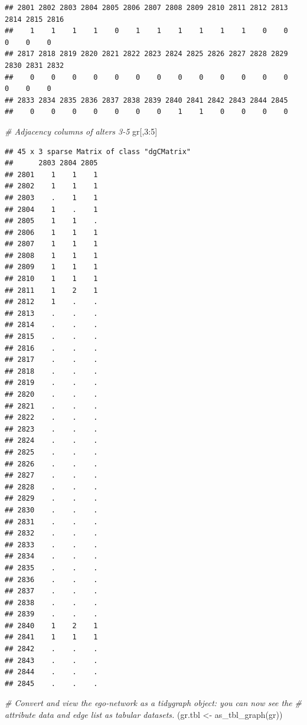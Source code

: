 \documentclass[
]{book}
\newenvironment{Shaded}{\begin{snugshade}}{\end{snugshade}}
\newcommand{\CommentTok}[1]{\textcolor[rgb]{0.56,0.35,0.01}{\textit{#1}}}
\newcommand{\DecValTok}[1]{\textcolor[rgb]{0.00,0.00,0.81}{#1}}
\newcommand{\FunctionTok}[1]{\textcolor[rgb]{0.00,0.00,0.00}{#1}}
\newcommand{\NormalTok}[1]{#1}
\newcommand{\OtherTok}[1]{\textcolor[rgb]{0.56,0.35,0.01}{#1}}
\newcommand{\SpecialCharTok}[1]{\textcolor[rgb]{0.00,0.00,0.00}{#1}}
\begin{document}
\begin{verbatim}
## 2801 2802 2803 2804 2805 2806 2807 2808 2809 2810 2811 2812 2813 2814 2815 2816 
##    1    1    1    1    0    1    1    1    1    1    1    0    0    0    0    0 
## 2817 2818 2819 2820 2821 2822 2823 2824 2825 2826 2827 2828 2829 2830 2831 2832 
##    0    0    0    0    0    0    0    0    0    0    0    0    0    0    0    0 
## 2833 2834 2835 2836 2837 2838 2839 2840 2841 2842 2843 2844 2845 
##    0    0    0    0    0    0    0    1    1    0    0    0    0
\end{verbatim}

\begin{Shaded}
\begin{Highlighting}[]
\CommentTok{\# Adjacency columns of alters 3{-}5}
\NormalTok{gr[,}\DecValTok{3}\SpecialCharTok{:}\DecValTok{5}\NormalTok{]}
\end{Highlighting}
\end{Shaded}

\begin{verbatim}
## 45 x 3 sparse Matrix of class "dgCMatrix"
##      2803 2804 2805
## 2801    1    1    1
## 2802    1    1    1
## 2803    .    1    1
## 2804    1    .    1
## 2805    1    1    .
## 2806    1    1    1
## 2807    1    1    1
## 2808    1    1    1
## 2809    1    1    1
## 2810    1    1    1
## 2811    1    2    1
## 2812    1    .    .
## 2813    .    .    .
## 2814    .    .    .
## 2815    .    .    .
## 2816    .    .    .
## 2817    .    .    .
## 2818    .    .    .
## 2819    .    .    .
## 2820    .    .    .
## 2821    .    .    .
## 2822    .    .    .
## 2823    .    .    .
## 2824    .    .    .
## 2825    .    .    .
## 2826    .    .    .
## 2827    .    .    .
## 2828    .    .    .
## 2829    .    .    .
## 2830    .    .    .
## 2831    .    .    .
## 2832    .    .    .
## 2833    .    .    .
## 2834    .    .    .
## 2835    .    .    .
## 2836    .    .    .
## 2837    .    .    .
## 2838    .    .    .
## 2839    .    .    .
## 2840    1    2    1
## 2841    1    1    1
## 2842    .    .    .
## 2843    .    .    .
## 2844    .    .    .
## 2845    .    .    .
\end{verbatim}

\begin{Shaded}
\begin{Highlighting}[]
\CommentTok{\# Convert and view the ego{-}network as a tidygraph object: you can now see the }
\CommentTok{\# attribute data and edge list as tabular datasets.}
\NormalTok{(gr.tbl }\OtherTok{\textless{}{-}} \FunctionTok{as\_tbl\_graph}\NormalTok{(gr))}
\end{Highlighting}
\end{Shaded}
\end{document}
